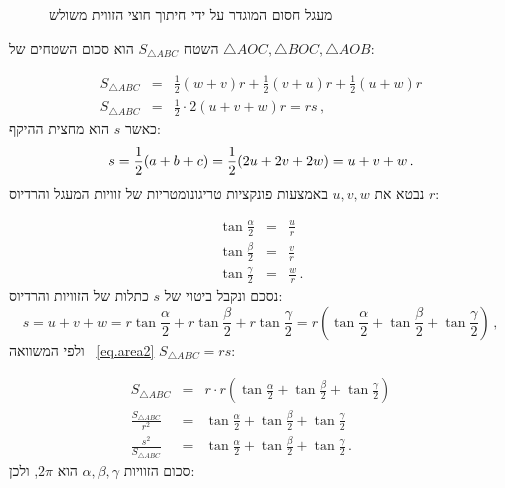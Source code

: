 \begin{figure}[h]
\begin{center}
\end{center}
\caption{מעגל חסום המוגדר על ידי חיתוך חוצי הזווית משולש}\label{f.inscribed}
\end{figure}



השטח 
$S_{\triangle ABC}$
הוא סכום השטחים של 
$\triangle AOC, \triangle BOC, \triangle AOB$:

\begin{eqnarray}
S_{\triangle ABC} &=& \frac{1}{2}(w+v)r + \frac{1}{2}(v+u)r + \frac{1}{2}(u+w)r\label{eq.area1}\\
S_{\triangle ABC}&=& \frac{1}{2}\cdot 2(u+v+w)r = rs\,, \label{eq.area2}
\end{eqnarray}
כאשר 
$s$
הוא מחצית ההיקף:
\[
s=\displaystyle\frac{1}{2}(a+b+c)=\displaystyle\frac{1}{2}(2u+2v+2w)=u+v+w\,.
\]
נבטא את 
$u,v,w$
באמצעות פונקציות טריגונומטריות של זוויות המעגל והרדיוס
$r$:




\begin{eqnarray}
\tan \frac{\alpha}{2} &=& \frac{u}{r}\label{eq.alpha}\\
\tan \frac{\beta}{2} &=& \frac{v}{r}\label{eq.beta}\\
\tan \frac{\gamma}{2} &=& \frac{w}{r}\label{eq.gamma}\,.
\end{eqnarray}
נסכם ונקבל ביטוי של 
$s$
כתלות של הזוויות והרדיוס:
\[
s = u+v+w = r\tan \frac{\alpha}{2}+r\tan \frac{\beta}{2}+r\tan \frac{\gamma}{2} = r\left(\tan \frac{\alpha}{2}+\tan \frac{\beta}{2}+\tan \frac{\gamma}{2}\right)\,,
\]
ולפי המשוואה~%
\ref{eq.area2}
$S_{\triangle ABC}=rs$:

\begin{eqnarray}
S_{\triangle ABC} &=&r\cdot r\left(\tan \frac{\alpha}{2}+\tan \frac{\beta}{2}+\tan \frac{\gamma}{2}\right)\label{eq.area3}\\
\frac{S_{\triangle ABC}}{r^2} &=& \tan \frac{\alpha}{2}+\tan \frac{\beta}{2}+\tan \frac{\gamma}{2} \label{eq.area4}\\
\frac{s^2}{S_{\triangle ABC}} &=& \tan \frac{\alpha}{2}+\tan \frac{\beta}{2}+\tan \frac{\gamma}{2} \label{eq.area5}\,.
\end{eqnarray}
סכום הזוויות
$\alpha,\beta,\gamma$
הוא
$2\pi$,
ולכן:

